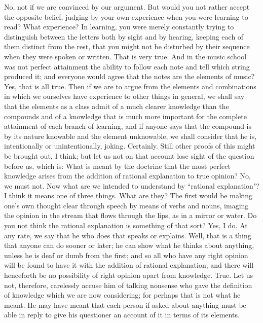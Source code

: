 \documentclass[letterpaper,12pt]{article}
\newcommand{\stephpag}[1]{\marginnote{\small\itshape\fontfamily{ppl}\selectfont #1}}
\begin{document}
\begin{drama}
\theaetetusspeaks
No, not if we are convinced by our argument. \stephpag{206 a}
\socratesspeaks
But would you not rather accept the opposite belief, judging by your own experience when you were learning to read?
\theaetetusspeaks
What experience?
\socratesspeaks
In learning, you were merely constantly trying to distinguish between the letters both by sight and by hearing, keeping each of them distinct from the rest, that you might not be disturbed by their sequence when they were spoken or written.
\theaetetusspeaks
That is very true.
\socratesspeaks
And in the music school was not perfect attainment \stephpag{b} the ability to follow each note and tell which string produced it; and everyone would agree that the notes are the elements of music?
\theaetetusspeaks
Yes, that is all true.
\socratesspeaks
Then if we are to argue from the elements and combinations in which we ourselves have experience to other things in general, we shall say that the elements as a class admit of a much clearer knowledge than the compounds and of a knowledge that is much more important for the complete attainment of each branch of learning, and if anyone says that the compound is by its nature knowable and the element unknowable, we shall consider that he is, intentionally or unintentionally, joking.
\theaetetusspeaks
Certainly. \stephpag{c}
\socratesspeaks
Still other proofs of this might be brought out, I think; but let us not on that account lose sight of the question before us, which is: What is meant by the doctrine that the most perfect knowledge arises from the addition of rational explanation to true opinion?
\theaetetusspeaks
No, we must not.
\socratesspeaks
Now what are we intended to understand by ``rational explanation"? I think it means one of three things.
\theaetetusspeaks
What are they? \stephpag{d}
\socratesspeaks
The first would be making one's own thought clear through speech by means of verbs and nouns, imaging the opinion in the stream that flows through the lips, as in a mirror or water. Do you not think the rational explanation is something of that sort?
\theaetetusspeaks
Yes, I do. At any rate, we say that he who does that speaks or explains.
\socratesspeaks
Well, that is a thing that anyone can do sooner or later; he can show what he thinks about anything, unless he is deaf or dumb from the first; and so \stephpag{e} all who have any right opinion will be found to have it with the addition of rational explanation, and there will henceforth be no possibility of right opinion apart from knowledge.
\theaetetusspeaks
True.
\socratesspeaks
Let us not, therefore, carelessly accuse him of talking nonsense who gave the definition of knowledge which we are now considering; for perhaps that is not what he meant. He may have meant that each person if asked about anything must be able in reply \stephpag{207 a} to give his questioner an account of it in terms of its elements.

\end{drama}
\end{document}
